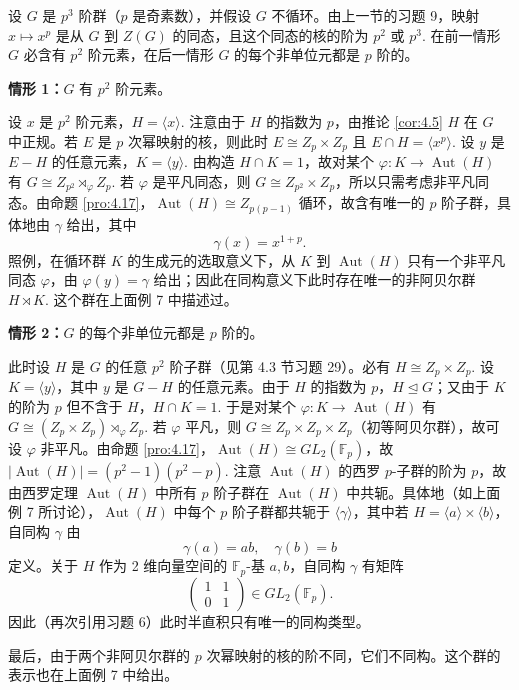 \begin{example}[\(p^3\) 阶群，\(p\) 是奇素数]
设 \(G\) 是 \(p^3\) 阶群（\(p\) 是奇素数），并假设 \(G\) 不循环。由上一节的习题 9，映射 \(x \mapsto x^p\) 是从 \(G\) 到 \(Z(G)\) 的同态，且这个同态的核的阶为 \(p^2\) 或 \(p^3\). 在前一情形 \(G\) 必含有 \(p^2\) 阶元素，在后一情形 \(G\) 的每个非单位元都是 \(p\) 阶的。

\textbf{情形 1：}\(G\) 有 \(p^2\) 阶元素。

设 \(x\) 是 \(p^2\) 阶元素，\(H = \langle x \rangle\). 注意由于 \(H\) 的指数为 \(p\)，由推论 \ref{cor:4.5} \(H\) 在 \(G\) 中正规。若 \(E\) 是 \(p\) 次幂映射的核，则此时 \(E \cong Z_p \times Z_p\) 且 \(E \cap H = \langle x^p \rangle\). 设 \(y\) 是 \(E - H\) 的任意元素，\(K = \langle y \rangle\). 由构造 \(H \cap K = 1\)，故对某个 \(\varphi : K \to \operatorname{Aut}(H)\) 有 \(G \cong Z_{p^2} \rtimes_\varphi Z_p\). 若 \(\varphi\) 是平凡同态，则 \(G \cong Z_{p^2} \times Z_p\)，所以只需考虑非平凡同态。由命题 \ref{pro:4.17}，\(\operatorname{Aut}(H) \cong Z_{p(p-1)}\) 循环，故含有唯一的 \(p\) 阶子群，具体地由 \(\gamma\) 给出，其中
\[
\gamma(x) = x^{1+p}.
\]
照例，在循环群 \(K\) 的生成元的选取意义下，从 \(K\) 到 \(\operatorname{Aut}(H)\) 只有一个非平凡同态 \(\varphi\)，由 \(\varphi(y) = \gamma\) 给出；因此在同构意义下此时存在唯一的非阿贝尔群 \(H \rtimes K\). 这个群在上面例 7 中描述过。

\textbf{情形 2：}\(G\) 的每个非单位元都是 \(p\) 阶的。

此时设 \(H\) 是 \(G\) 的任意 \(p^2\) 阶子群（见第 4.3 节习题 29）。必有 \(H \cong Z_p \times Z_p\). 设 \(K = \langle y \rangle\)，其中 \(y\) 是 \(G - H\) 的任意元素。由于 \(H\) 的指数为 \(p\)，\(H \trianglelefteq G\)；又由于 \(K\) 的阶为 \(p\) 但不含于 \(H\)，\(H \cap K = 1\). 于是对某个 \(\varphi : K \to \operatorname{Aut}(H)\) 有 \(G \cong (Z_p \times Z_p) \rtimes_\varphi Z_p\). 若 \(\varphi\) 平凡，则 \(G \cong Z_p \times Z_p \times Z_p\)（初等阿贝尔群），故可设 \(\varphi\) 非平凡。由命题 \ref{pro:4.17}，\(\operatorname{Aut}(H) \cong GL_2(\mathbb{F}_p)\)，故 \(|\operatorname{Aut}(H)| = (p^2-1)(p^2-p)\). 注意 \(\operatorname{Aut}(H)\) 的西罗 \(p\)-子群的阶为 \(p\)，故由西罗定理 \(\operatorname{Aut}(H)\) 中所有 \(p\) 阶子群在 \(\operatorname{Aut}(H)\) 中共轭。具体地（如上面例 7 所讨论），\(\operatorname{Aut}(H)\) 中每个 \(p\) 阶子群都共轭于 \(\langle \gamma \rangle\)，其中若 \(H = \langle a \rangle \times \langle b \rangle\)，自同构 \(\gamma\) 由
\[
\gamma(a) = ab, \quad \gamma(b) = b
\]
定义。关于 \(H\) 作为 2 维向量空间的 \(\mathbb{F}_p\)-基 \(a, b\)，自同构 \(\gamma\) 有矩阵
\[
\begin{pmatrix} 1 & 1 \\ 0 & 1 \end{pmatrix} \in GL_2(\mathbb{F}_p).
\]
因此（再次引用习题 6）此时半直积只有唯一的同构类型。

最后，由于两个非阿贝尔群的 \(p\) 次幂映射的核的阶不同，它们不同构。这个群的表示也在上面例 7 中给出。
\end{example}


